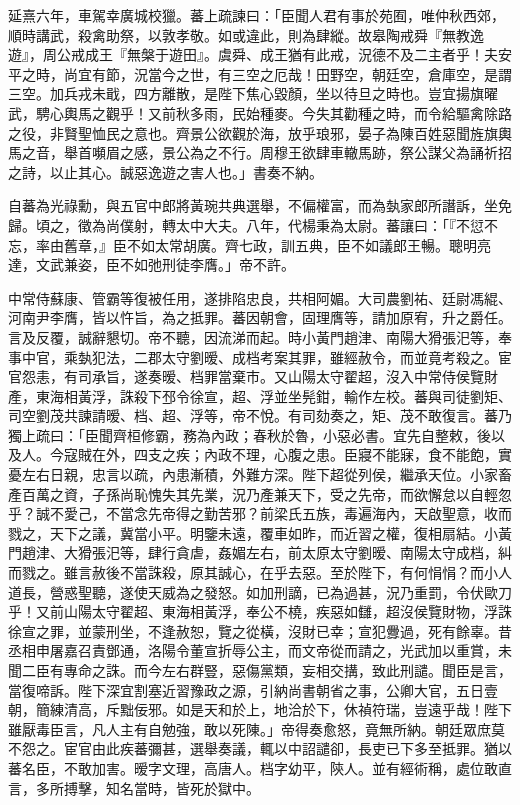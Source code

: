 \begin{pinyinscope}
延熹六年，車駕幸廣城校獵。蕃上疏諫曰：「臣聞人君有事於苑囿，唯仲秋西郊，順時講武，殺禽助祭，以敦孝敬。如或違此，則為肆縱。故皋陶戒舜『無教逸遊』，周公戒成王『無槃于遊田』。虞舜、成王猶有此戒，況德不及二主者乎！夫安平之時，尚宜有節，況當今之世，有三空之厄哉！田野空，朝廷空，倉庫空，是謂三空。加兵戎未戢，四方離散，是陛下焦心毀顏，坐以待旦之時也。豈宜揚旗曜武，騁心輿馬之觀乎！又前秋多雨，民始種麥。今失其勸種之時，而令給驅禽除路之役，非賢聖恤民之意也。齊景公欲觀於海，放乎琅邪，晏子為陳百姓惡聞旌旗輿馬之音，舉首嚬眉之感，景公為之不行。周穆王欲肆車轍馬跡，祭公謀父為誦祈招之詩，以止其心。誠惡逸遊之害人也。」書奏不納。

自蕃為光祿勳，與五官中郎將黃琬共典選舉，不偏權富，而為埶家郎所譖訴，坐免歸。頃之，徵為尚僕射，轉太中大夫。八年，代楊秉為太尉。蕃讓曰：「『不愆不忘，率由舊章，』臣不如太常胡廣。齊七政，訓五典，臣不如議郎王暢。聰明亮達，文武兼姿，臣不如弛刑徒李膺。」帝不許。

中常侍蘇康、管霸等復被任用，遂排陷忠良，共相阿媚。大司農劉祐、廷尉馮緄、河南尹李膺，皆以忤旨，為之抵罪。蕃因朝會，固理膺等，請加原宥，升之爵任。言及反覆，誠辭懇切。帝不聽，因流涕而起。時小黃門趙津、南陽大猾張汜等，奉事中官，乘埶犯法，二郡太守劉暧、成档考案其罪，雖經赦令，而並竟考殺之。宦官怨恚，有司承旨，遂奏暧、档罪當棄市。又山陽太守翟超，沒入中常侍侯覽財產，東海相黃浮，誅殺下邳令徐宣，超、浮並坐髡鉗，輸作左校。蕃與司徒劉矩、司空劉茂共諫請暧、档、超、浮等，帝不悅。有司劾奏之，矩、茂不敢復言。蕃乃獨上疏曰：「臣聞齊桓修霸，務為內政；春秋於魯，小惡必書。宜先自整敕，後以及人。今寇賊在外，四支之疾；內政不理，心腹之患。臣寢不能寐，食不能飽，實憂左右日親，忠言以疏，內患漸積，外難方深。陛下超從列侯，繼承天位。小家畜產百萬之資，子孫尚恥愧失其先業，況乃產兼天下，受之先帝，而欲懈怠以自輕忽乎？誠不愛己，不當念先帝得之勤苦邪？前梁氏五族，毒遍海內，天啟聖意，收而戮之，天下之議，冀當小平。明鑒未遠，覆車如昨，而近習之權，復相扇結。小黃門趙津、大猾張汜等，肆行貪虐，姦媚左右，前太原太守劉暧、南陽太守成档，糾而戮之。雖言赦後不當誅殺，原其誠心，在乎去惡。至於陛下，有何悁悁？而小人道長，營惑聖聽，遂使天威為之發怒。如加刑謫，已為過甚，況乃重罰，令伏歐刀乎！又前山陽太守翟超、東海相黃浮，奉公不橈，疾惡如讎，超沒侯覽財物，浮誅徐宣之罪，並蒙刑坐，不逢赦恕，覽之從橫，沒財已幸；宣犯釁過，死有餘辜。昔丞相申屠嘉召責鄧通，洛陽令董宣折辱公主，而文帝從而請之，光武加以重賞，未聞二臣有專命之誅。而今左右群豎，惡傷黨類，妄相交搆，致此刑譴。聞臣是言，當復啼訴。陛下深宜割塞近習豫政之源，引納尚書朝省之事，公卿大官，五日壹朝，簡練清高，斥黜佞邪。如是天和於上，地洽於下，休禎符瑞，豈遠乎哉！陛下雖厭毒臣言，凡人主有自勉強，敢以死陳。」帝得奏愈怒，竟無所納。朝廷眾庶莫不怨之。宦官由此疾蕃彌甚，選舉奏議，輒以中詔譴卻，長吏已下多至抵罪。猶以蕃名臣，不敢加害。暧字文理，高唐人。档字幼平，陝人。並有經術稱，處位敢直言，多所搏擊，知名當時，皆死於獄中。


\end{pinyinscope}
